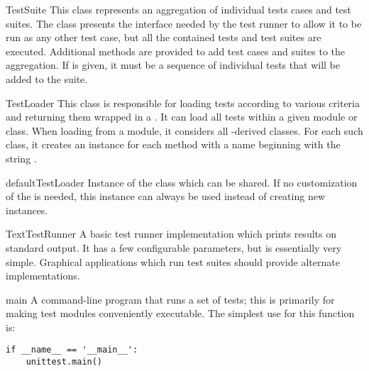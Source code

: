 \begin{classdesc}{TestSuite}{}
  This class represents an aggregation of individual tests cases and
  test suites.  The class presents the interface needed by the test
  runner to allow it to be run as any other test case, but all the
  contained tests and test suites are executed.  Additional methods
  are provided to add test cases and suites to the aggregation.  If
   is given, it must be a sequence of individual tests that
  will be added to the suite.
\end{classdesc}

\begin{classdesc}{TestLoader}{}
  This class is responsible for loading tests according to various
  criteria and returning them wrapped in a .
  It can load all tests within a given module or 
  class.  When loading from a module, it considers all
  -derived classes.  For each such class, it creates
  an instance for each method with a name beginning with the string
  .
\end{classdesc}

\begin{datadesc}{defaultTestLoader}
  Instance of the  class which can be shared.  If no
  customization of the  is needed, this instance can
  always be used instead of creating new instances.
\end{datadesc}

\begin{classdesc}{TextTestRunner}{}
  A basic test runner implementation which prints results on standard
  output.  It has a few configurable parameters, but is essentially
  very simple.  Graphical applications which run test suites should
  provide alternate implementations.
\end{classdesc}

\begin{funcdesc}{main}{}
  A command-line program that runs a set of tests; this is primarily
  for making test modules conveniently executable.  The simplest use
  for this function is:

\begin{verbatim}
if __name__ == '__main__':
    unittest.main()
\end{verbatim}
\end{funcdesc}


